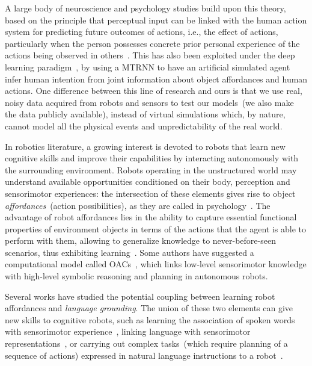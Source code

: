 A large body of neuroscience and psychology studies build upon this theory, based on the principle that perceptual input can be linked with the human action system for predicting future outcomes of actions, i.e., the effect of actions, particularly when the person possesses concrete prior personal experience of the actions being observed in others~\cite{aglioti:2008:basketball,knoblich:2001:psychsci}.
This has also been exploited under the deep learning paradigm~\cite{kim:2017:nn}, by using a \ac{MTRNN} to have an artificial simulated agent infer human intention from joint information about object affordances and human actions.
One difference between this line of research and ours is that we use real, noisy data acquired from robots and sensors to test our models~(we also make the data publicly available), instead of virtual simulations which, by nature, cannot model all the physical events and unpredictability of the real world.

In robotics literature, a growing interest is devoted to robots that learn new cognitive skills and improve their capabilities by interacting autonomously with the surrounding environment.
Robots operating in the unstructured world may understand available opportunities conditioned on their body, perception and sensorimotor experiences: the intersection of these elements gives rise to object \emph{affordances}~(action possibilities), as they are called in psychology~\cite{gibson:2014}.
The advantage of robot affordances lies in the ability to capture essential functional properties of environment objects in terms of the actions that the agent is able to perform with them, allowing to generalize knowledge to never-before-seen scenarios, thus exhibiting learning~\cite{montesano:2008,jamone:2016:tcds}.
Some authors have suggested a computational model called \acp{OAC}~\cite{kruger:2011:ras}, which links low-level sensorimotor knowledge with high-level symbolic reasoning and planning in autonomous robots.

Several works have studied the potential coupling between learning robot affordances and \emph{language grounding}.
The union of these two elements can give new skills to cognitive robots, such as learning the association of spoken words with sensorimotor experience~\cite{salvi:2012:smcb,morse:2016:cogsci}, linking language with sensorimotor representations~\cite{stramandinoli:2016:icdl},%
or carrying out complex %
tasks~(which require planning of a sequence of actions) expressed in natural language instructions to a robot~\cite{antunes:2016:icra}.

